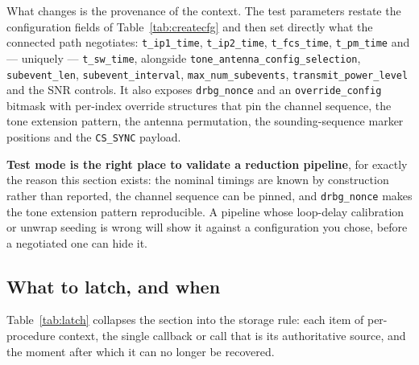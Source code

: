 \documentclass[11pt,a4paper]{article}
\newcommand{\code}[1]{\texttt{\small #1}}
\begin{document}
What changes is the provenance of the context. The test parameters restate the configuration fields
of Table~\ref{tab:createcfg} and then set directly what the connected path negotiates:
\code{t\_\allowbreak{}ip1\_\allowbreak{}time}, \code{t\_\allowbreak{}ip2\_\allowbreak{}time}, \code{t\_\allowbreak{}fcs\_\allowbreak{}time}, \code{t\_\allowbreak{}pm\_\allowbreak{}time}
and --- uniquely --- \code{t\_\allowbreak{}sw\_\allowbreak{}time}, alongside
\code{tone\_\allowbreak{}antenna\_\allowbreak{}config\_\allowbreak{}selection}, \code{subevent\_\allowbreak{}len},
\code{subevent\_\allowbreak{}interval}, \code{max\_\allowbreak{}num\_\allowbreak{}subevents}, \code{transmit\_\allowbreak{}power\_\allowbreak{}level} and
the SNR controls. It also exposes \code{drbg\_\allowbreak{}nonce} and an \code{override\_\allowbreak{}config} bitmask with
per-index override structures that pin the channel sequence, the tone extension pattern, the antenna
permutation, the sounding-sequence marker positions and the \code{CS\_\allowbreak{}SYNC} payload.

\begin{callout}
\textbf{Test mode is the right place to validate a reduction pipeline}, for exactly the reason this
section exists: the nominal timings are known by construction rather than reported, the channel
sequence can be pinned, and \code{drbg\_\allowbreak{}nonce} makes the tone extension pattern reproducible. A
pipeline whose loop-delay calibration or unwrap seeding is wrong will show it against a configuration
you chose, before a negotiated one can hide it.
\end{callout}

\subsection{What to latch, and when}
\label{sec:latch}

Table~\ref{tab:latch} collapses the section into the storage rule: each item of per-procedure
context, the single callback or call that is its authoritative source, and the moment after which it
can no longer be recovered.
\end{document}
